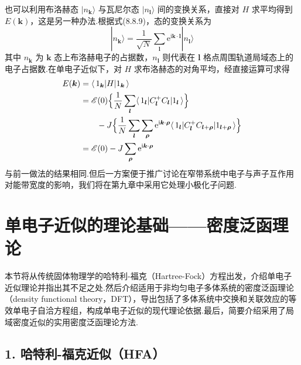 也可以利用布洛赫态 $|n_{\boldsymbol{k}}\rangle$ 与瓦尼尔态 $|n_{\boldsymbol{l}}\rangle$ 间的变换关系，直接对 $H$ 求平均得到 $E(\boldsymbol{k})$，这是另一种办法.根据式(8.8.9)，态的变换关系为
\begin{equation}
  |n_{\boldsymbol{k}}\rangle=\frac{1}{\sqrt{N}}\sum_{\boldsymbol{l}}\mathrm{e}^{\mathrm{i}\boldsymbol{k}\cdot\boldsymbol{l}}|n_{\boldsymbol{l}}\rangle
\end{equation}
其中 $n_{\boldsymbol{k}}$ 为 $\boldsymbol{k}$ 态上布洛赫电子的占据数，$n_{\boldsymbol{l}}$ 则代表在 $\boldsymbol{l}$ 格点周围轨道局域态上的电子占据数.在单电子近似下，对 $H$ 求布洛赫态的对角平均，经直接运算可求得
\begin{equation}
\begin{aligned}
  E(\boldsymbol{k})&=\langle\,1_{\boldsymbol{k}}|H|1_{\boldsymbol{k}}\,\rangle\\
  &=\mathscr{E}(0)\Bigl\{\frac{1}{N}\sum_{\boldsymbol{l}}\langle\,1_{\boldsymbol{l}}|C_{\boldsymbol{l}}^{+}C_{\boldsymbol{l}}|1_{\boldsymbol{l}}\,\rangle\Bigr\}\\
  &\qquad-J\Bigl\{\frac{1}{N}\sum_{\boldsymbol{l}}\sum_{\boldsymbol{\rho}}\mathrm{e}^{\mathrm{i}\boldsymbol{k}\cdot\boldsymbol{\rho}}
  \langle\,1_{\boldsymbol{l}}|C_{\boldsymbol{l}}^{+}C_{\boldsymbol{l}+\boldsymbol{\rho}}|1_{\boldsymbol{l}+\boldsymbol{\rho}}\,\rangle\Bigr\}\\
  &=\mathscr{E}(0)-J\sum_{\boldsymbol{\rho}}\mathrm{e}^{\mathrm{i}\boldsymbol{k}\cdot\boldsymbol{\rho}}
\end{aligned}
\end{equation}
与前一做法的结果相同.但后一方案便于推广讨论在窄带系统中电子与声子互作用对能带宽度的影响，我们将在第九章中采用它处理小极化子问题.
\section{单电子近似的理论基础——密度泛函理论}

本节将从传统固体物理学的哈特利-福克（Hartree-Fock）方程出发，介绍单电子近似理论并指出其不足之处.然后介绍适用于非均匀电子多体系统的密度泛函理论（density functional theory，DFT），导出包括了多体系统中交换和关联效应的等效单电子自洽方程组，构成单电子近似的现代理论依据.最后，简要介绍采用了局域密度近似的实用密度泛函理论方法.

\subsection*{1. 哈特利-福克近似（HFA）}

